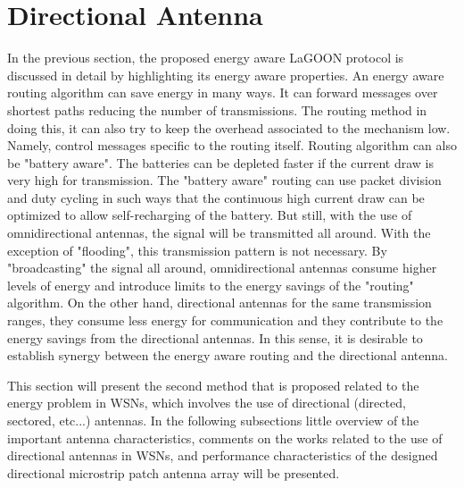 \documentclass[12pt, oneandhalf, chaparabic, sees, ms]{metu}
\begin{document}
\chapter{Directional Antenna}\label{cdantenna}

In the previous section, the proposed energy aware LaGOON protocol is discussed in detail by highlighting its energy aware properties. 
An energy aware routing algorithm can save energy in many ways. It can forward messages over shortest paths reducing the number of transmissions.
The routing method in doing this, it can also try to keep the overhead associated to the mechanism low. Namely, control messages specific to the routing itself.
Routing algorithm can also be "battery aware". The batteries can be depleted faster if the current draw is very high for transmission. The "battery aware"
routing can use packet division and duty cycling in such ways that the continuous high current draw can be optimized to allow self-recharging of the battery.
But still, with the use of omnidirectional antennas, the signal will be transmitted all around. With the exception of "flooding", this transmission pattern is not necessary.
By "broadcasting" the signal all around, omnidirectional antennas consume higher levels of energy and introduce limits to the energy savings of the "routing" algorithm.
On the other hand, directional antennas for the same transmission ranges, they consume less energy for communication and they contribute to the energy savings from 
the directional antennas.
In this sense, it is desirable to establish synergy between the energy aware routing and the directional antenna.

This section will present the second method that is proposed related to the energy problem in WSNs, which involves the use of directional (directed, sectored, etc...) antennas.
In the following subsections little overview of the important antenna characteristics, comments on the works related to the use of directional antennas in WSNs, and 
performance characteristics of the designed directional microstrip patch antenna array will be presented.


\newpage
\end{document}
